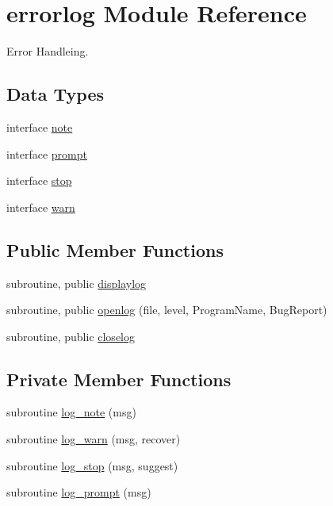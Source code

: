 \hypertarget{classerrorlog}{\section{errorlog Module Reference}
\label{classerrorlog}
}


Error Handleing.  


\subsection*{Data Types}
\begin{DoxyCompactItemize}
\item 
interface \hyperlink{interfaceerrorlog_1_1note}{note}
\item 
interface \hyperlink{interfaceerrorlog_1_1prompt}{prompt}
\item 
interface \hyperlink{interfaceerrorlog_1_1stop}{stop}
\item 
interface \hyperlink{interfaceerrorlog_1_1warn}{warn}
\end{DoxyCompactItemize}
\subsection*{Public Member Functions}
\begin{DoxyCompactItemize}
\item 
subroutine, public \hyperlink{classerrorlog_a05d233f410ba88bf3e2929528b1bb91e}{displaylog}
\item 
subroutine, public \hyperlink{classerrorlog_a32bbf87dd265de25bd10ea31d95b751d}{openlog} (file, level, Program\+Name, Bug\+Report)
\item 
subroutine, public \hyperlink{classerrorlog_af9219c790b58905faca7f5695515325d}{closelog}
\end{DoxyCompactItemize}
\subsection*{Private Member Functions}
\begin{DoxyCompactItemize}
\item 
subroutine \hyperlink{classerrorlog_abcaf87ab55e0634007cc7177aa53469c}{log\+\_\+note} (msg)
\item 
subroutine \hyperlink{classerrorlog_ac0a3d2c2bcdb3af8e91b4a27d2ac5ac0}{log\+\_\+warn} (msg, recover)
\item 
subroutine \hyperlink{classerrorlog_afe1872ea4ca114ccb25faaa2f2d60e2e}{log\+\_\+stop} (msg, suggest)
\item 
subroutine \hyperlink{classerrorlog_ac6531d63b5a5d4939c3d510dd7fbbb25}{log\+\_\+prompt} (msg)
\end{DoxyCompactItemize}
